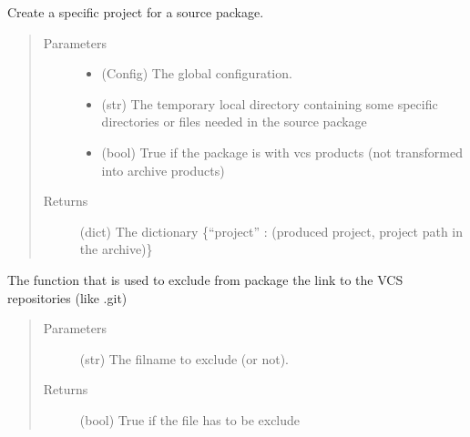 \documentclass[a4paper,10pt,english]{sphinxmanual}
\begin{document}
\begin{fulllineitems}
\label{\detokenize{apidoc_commands/commands:commands.package.create_project_for_src_package}}
Create a specific project for a source package.
\begin{quote}\begin{description}
\item[{Parameters}] \leavevmode\begin{itemize}
\item {} 
 \textendash{} (Config) The global configuration.

\item {} 
 \textendash{} (str)
The temporary local directory containing some specific directories
or files needed in the source package

\item {} 
 \textendash{} (bool) 
True if the package is with vcs products 
(not transformed into archive products)

\end{itemize}

\item[{Returns}] \leavevmode
(dict)
The dictionary 
\{“project” : (produced project, project path in the archive)\}

\end{description}\end{quote}

\end{fulllineitems}


\begin{fulllineitems}
\label{\detokenize{apidoc_commands/commands:commands.package.exclude_VCS_and_extensions}}
The function that is used to exclude from package the link to the 
VCS repositories (like .git)
\begin{quote}\begin{description}
\item[{Parameters}] \leavevmode
{} \textendash{} (str) The filname to exclude (or not).

\item[{Returns}] \leavevmode
(bool) True if the file has to be exclude

\end{description}\end{quote}

\end{fulllineitems}
\end{document}
